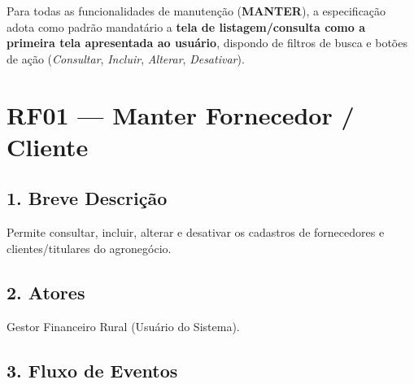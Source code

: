 \documentclass[
	12pt,
	oneside,
	a4paper,
	brazilian
]{abntex2}
\begin{document}
Para todas as funcionalidades de manutenção (\textbf{MANTER}), a especificação adota como padrão mandatário a \textbf{tela de listagem/consulta como a primeira tela apresentada ao usuário}, dispondo de filtros de busca e botões de ação (\textit{Consultar}, \textit{Incluir}, \textit{Alterar}, \textit{Desativar}).

\section*{RF01 — Manter Fornecedor / Cliente}

\subsection*{1. Breve Descrição}
Permite consultar, incluir, alterar e desativar os cadastros de fornecedores e clientes/titulares do agronegócio.

\subsection*{2. Atores}
Gestor Financeiro Rural (Usuário do Sistema).

\subsection*{3. Fluxo de Eventos}
\end{document}
